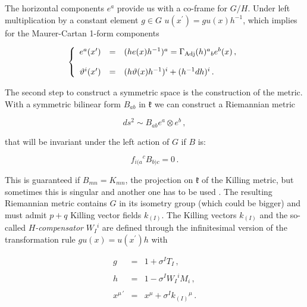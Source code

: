 \documentclass[12pt,a4paper]{article}
\begin{document}
The horizontal components $e^{a}$ provide us with a co-frame for
$G/H$.  Under left multiplication by a constant element $g\in G$
$u(x^{\prime}) = gu(x)h^{-1}$, which implies for the Maurer-Cartan
1-form components

\begin{equation}
\label{eq:transformation1}
\left\{
  \begin{array}{rcl}
e^{a}(x^{\prime}) & = & (h e(x) h^{-1})^{a} 
= \Gamma_{\rm Adj}(h)^{a}{}_{b} e^{b}(x)\, ,\\
& & \\
\vartheta^{i}(x^{\prime}) & = & 
(h \vartheta(x) h^{-1})^{i} +(h^{-1}dh)^{i}\, .\\
  \end{array}
\right.
\end{equation}


The second step to construct a symmetric space is the construction of
the metric. With a symmetric bilinear form $B_{ab}$ in $\mathfrak{k}$
we can construct a Riemannian metric

\begin{equation}
ds^{2} \sim B_{ab}e^{a}\otimes e^{b}\, ,  
\end{equation}

\noindent 
that will be invariant under the left action of $G$ if $B$ is:

\begin{equation}
f_{i(a}{}^{c}B_{b)c}=0\, .  
\end{equation}

\noindent 
This is guaranteed if $B_{mn}=K_{mn}$, the projection on
$\mathfrak{k}$ of the Killing metric, but sometimes this is singular
and another one has to be used . The resulting Riemannian metric
contains $G$ in its isometry group (which could be bigger) and must
admit $p+q$ Killing vector fields $k_{(I)}$. The Killing vectors
$k_{(I)}$ and the so-called {\it $H$-compensator} $W_{I}{}^{i}$ are
defined through the infinitesimal version of the transformation rule
$gu(x)=u(x^{\prime})h$ with

\begin{equation}
  \begin{array}{rcl}
g & = & 1 + \sigma^{I}T_{I}\, ,\\
& & \\
h & = & 1 -\sigma^{I}W_{I}{}^{i}M_{i}\, ,\\
& & \\
x^{\mu\, \prime} & = & x^{\mu} +\sigma^{I}k_{(I)}{}^{\mu}\, .\\
  \end{array}
\end{equation}
\end{document}

